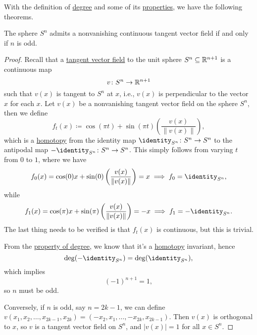 With the definition of \hyperref[def:degree]{degree} and some of its \hyperref[rmk:property-of-degree]{properties}, we have the following theorems.
\begin{theorem}\label{thm:hairy-ball-theorem}
	The sphere \(S^n\) admits a nonvanishing continuous tangent vector field if and only if \(n\) is odd.
\end{theorem}
\begin{proof}
	Recall that a \underline{tangent vector field} to the unit sphere \(S^n\subseteq \mathbb{\MakeUppercase{r}} ^{n+1}\) is a continuous map
	\[
		v \colon S^n \to \mathbb{\MakeUppercase{r}} ^{n+1}
	\]
	such that \(v(x)\) is tangent to \(S^n\) at \(x\), i.e., \(v(x)\) is perpendicular to the vector \(x\) for each \(x\). Let \(v(x)\) be a
	nonvanishing tangent vector field on the sphere \(S^n\), then we define
	\[
		f_t(x) \coloneqq \cos (\pi t) + \sin (\pi t)\left(\frac{v(x)}{\left\lVert v(x)\right\rVert }\right),
	\]
	which is a \hyperref[def:homotopy]{homotopy} from the identity map \(\identity_{S^n}\colon S^n \to S^n \) to the antipodal map
	\(-\identity_{S^n}\colon S^{n}\to S^n\). This simply follows from varying \(t\) from \(0\) to \(1\), where we have
	\[
		f_0(x) = \cos (0) x + \sin (0) \left(\frac{v(x)}{\left\lVert v(x)\right\rVert }\right) = x \implies f_0 = \identity_{S^n} ,
	\]
	while
	\[
		f_1(x) = \cos (\pi )x + \sin (\pi )\left(\frac{v(x)}{\left\lVert v(x)\right\rVert }\right) = - x \implies f_{1} = - \identity_{S^n}.
	\]
	The last thing needs to be verified is that \(f_t(x)\) is continuous, but this is trivial.


	From the \hyperref[rmk:property-of-degree]{property of degree}, we know that it's a \hyperref[def:homotopy]{homotopy} invariant, hence
	\[
		\deg (-\identity_{S^n}) = \deg (\identity_{S^n} ),
	\]
	which implies
	\[
		(-1)^{n+1} = 1,
	\]
	so \(n\) must be odd.

	Conversely, if \(n\) is odd, say \(n=2k-1\), we can define \(v(x_1, x_2, \ldots , x_{2k-1}, x_{2k})= (-x_2, x_1, \ldots , -x_{2k}, x_{2k-1})\).
	Then \(v(x)\) is orthogonal to \(x\), so \(v\) is a tangent vector field on \(S^n\), and \(\left\vert v(x) \right\vert = 1\) for all \(x\in S^n\).
\end{proof}

